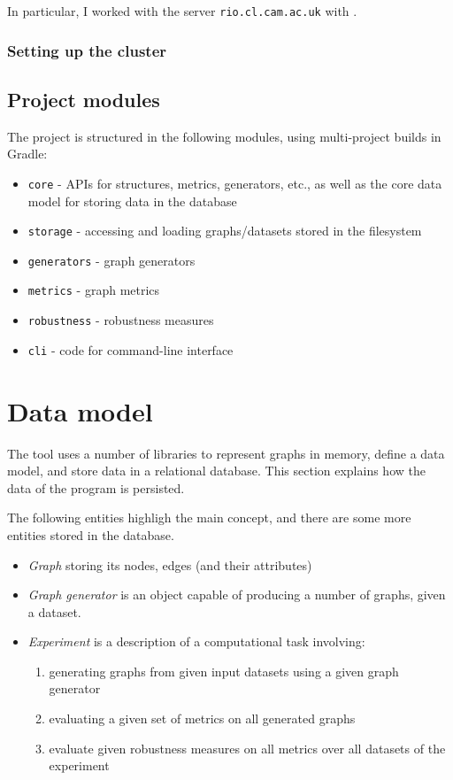 In particular, I worked with the server \texttt{rio.cl.cam.ac.uk} with .

\subsubsection{Setting up the cluster}

\subsection{Project modules}

The project is structured in the following modules, using multi-project builds in Gradle:
\begin{itemize}
    \item \texttt{core} - APIs for structures, metrics, generators, etc., as well as the core data model for storing data in the database
    \item \texttt{storage} - accessing and loading graphs/datasets stored in the filesystem
    \item \texttt{generators} - graph generators
    \item \texttt{metrics} - graph metrics
    \item \texttt{robustness} - robustness measures
    \item \texttt{cli} - code for command-line interface
\end{itemize}



\section{Data model}

The \graffs tool uses a number of libraries to represent graphs in memory, define a data model, and store data in a relational database.
This section explains how the data of the program is persisted.

The following entities highligh the main concept, and there are some more entities stored in the database.
\begin{itemize}[topsep=5pt]
    \item \textsl{Graph} storing its nodes, edges (and their attributes)
    \item \textsl{Graph generator} is an object capable of producing a number of graphs, given a dataset.
    \item \textsl{Experiment} is a description of a computational task involving:
    \begin{enumerate}[topsep=5pt]
        \item generating graphs from given input datasets using a given graph generator
        \item evaluating a given set of metrics on all generated graphs
        \item evaluate given robustness measures on all metrics over all datasets of the experiment
    \end{enumerate}
\end{itemize}

